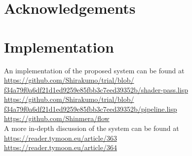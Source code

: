 \documentclass[format=sigconf]{acmart}
\begin{document}
\section{Acknowledgements}\label{acknowledgements}

\section{Implementation}\label{implementation}
An implementation of the proposed system can be found at
\\\href{https://github.com/Shirakumo/trial/blob/f34a79f0a6df21d1ed9259e85fbb3c7eed39352b/shader-pass.lisp}{https://github.com/Shirakumo/trial/blob/\\f34a79f0a6df21d1ed9259e85fbb3c7eed39352b/shader-pass.lisp}
\\\href{https://github.com/Shirakumo/trial/blob/f34a79f0a6df21d1ed9259e85fbb3c7eed39352b/pipeline.lisp}{https://github.com/Shirakumo/trial/blob/\\f34a79f0a6df21d1ed9259e85fbb3c7eed39352b/pipeline.lisp}
\\\url{https://github.com/Shinmera/flow} \\

A more in-depth discussion of the system can be found at
\\\url{https://reader.tymoon.eu/article/363}
\\\url{https://reader.tymoon.eu/article/364}


\end{document}
